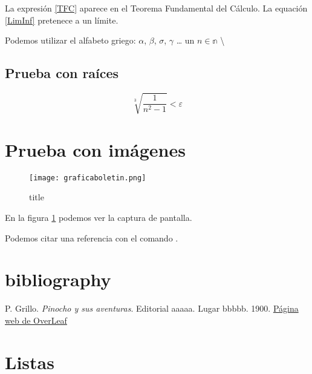 \documentclass[12pt]{article}
\begin{document}
        La expresión \eqref{TFC} aparece en el Teorema Fundamental del Cálculo.
        La equación \eqref{LimInf} pretenece a un límite.

        Podemos utilizar el alfabeto griego:
        $\alpha$, $\beta$, $\sigma$, $\gamma$ \dots
        \exists un $n\in\mathbb{n}$ \backslash 

        \subsection{Prueba con raíces}

            \begin{equation}
                \sqrt[3]{\frac{1}{n^2-1}} < \varepsilon
            \end{equation}

    \section{Prueba con imágenes}

        \begin{figure}[ht]\label{Grafica1}

            \centering %
            \texttt{[image: graficaboletin.png]} %
            \caption[short]{title} %

        \end{figure}

        En la figura \ref{Grafica1} podemos ver la captura de pantalla.

        Podemos citar una referencia con el comando \cite{Grillo}.

    \section{bibliography}

        \begin{thebibliography}{99}

             P. Grillo. \textit{Pinocho y sus aventuras}. Editorial aaaaa. Lugar bbbbb. 1900.
            \href{https://www.overleaf.com}{Página web de OverLeaf}
        
        \end{thebibliography}

    \section{Listas}
        
\end{document}
